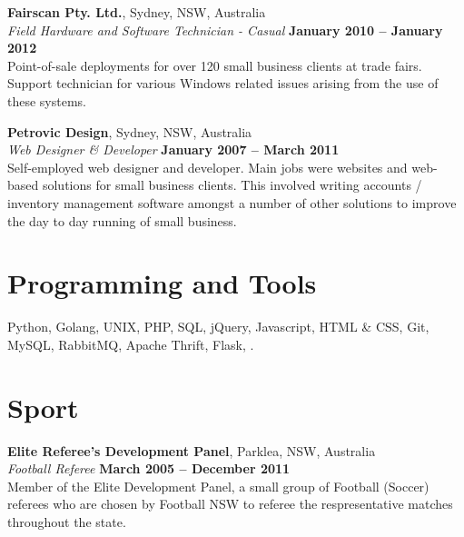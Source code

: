 \documentclass[margin,line]{resume}
\begin{document}
\begin{resume}
\newpage

    \textbf{Fairscan Pty. Ltd.}, Sydney, NSW, Australia \vspace{2mm}\\\vspace{1mm}%
    \textsl{Field Hardware and Software Technician - Casual} \hfill \textbf{January 2010 -- January 2012}\\
    Point-of-sale deployments for over 120 small business clients at trade fairs. Support technician for various Windows
    related issues arising from the use of these systems.

    \textbf{Petrovic Design}, Sydney, NSW, Australia \vspace{2mm}\\\vspace{1mm}%
    \textsl{Web Designer \& Developer} \hfill \textbf{January 2007 -- March 2011}\\
    Self-employed web designer and developer. Main jobs were websites and web-based solutions for small business clients.
    This involved writing accounts / inventory management software amongst a number of other solutions to improve the day
    to day running of small business.

    \section{\mysidestyle Programming and Tools} 

    Python, Golang, UNIX, PHP, SQL, jQuery, Javascript, HTML \& CSS, Git, MySQL, RabbitMQ, Apache Thrift, Flask, \LaTeXe.



\vspace{5mm}
\section{\mysidestyle Sport}
	
	\textbf{Elite Referee's Development Panel}, Parklea, NSW, Australia \vspace{2mm}\\\vspace{1mm}%
	\textsl{Football Referee} \hfill \textbf{March 2005 -- December 2011}\\
	Member of the Elite Development Panel, a small group of Football (Soccer) referees who are chosen by Football NSW
	to referee the respresentative matches throughout the state.



\end{resume}
\end{document}
